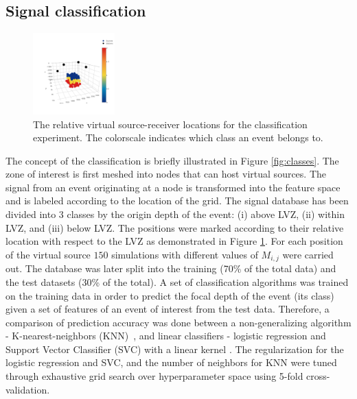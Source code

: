 \documentclass[letterpaper,11pt]{article}
\begin{document}
\subsection*{Signal classification}
\begin{figure}
\vspace{-16mm}
\centering
\includegraphics[width=0.28\textwidth]{./AntonBiryukov_bibtex/figure_foxcreek_classes.png}
\vspace{-4mm}
\caption{The relative virtual source-receiver locations for the classification experiment. The colorscale indicates which class an event belongs to.}
\label{fig:foxcreek_classes}
\end{figure}
The concept of the classification is briefly illustrated in Figure \ref{fig:classes}. The zone of interest is first meshed into nodes that can host virtual sources. The signal from an event originating at a node is transformed into the feature space and is labeled according to the location of the grid. The signal database has been divided into $3$ classes by the origin depth of the event: (i) above \textsc{LVZ}, (ii) within \textsc{LVZ}, and (iii) below \textsc{LVZ}.
The positions were marked according to their relative location with respect to the \textsc{LVZ} as demonstrated in Figure \ref{fig:foxcreek_classes}. For each position of the virtual source $150$ simulations with different values of $M_{i,j}$ were carried out. The database was later split into the training (70\% of the total data) and the test datasets ($30$\% of the total). 
A set of classification algorithms was trained on the training data in order to predict the focal depth of the event (its class) given a set of features of an event of interest from the test data. Therefore, a comparison of prediction accuracy was done between a non-generalizing algorithm - K-nearest-neighbors (\textsc{KNN})~\citep{cover_nearest_1967}, and linear classifiers - logistic regression \citep{jr_applied_2004} and Support Vector Classifier (\textsc{SVC}) with a linear kernel \citep{Guyon93automaticcapacity}. The regularization for the logistic regression and \textsc{SVC}, and the number of neighbors for \textsc{KNN} were tuned through exhaustive grid search over hyperparameter space using 5-fold cross-validation.
\end{document}

